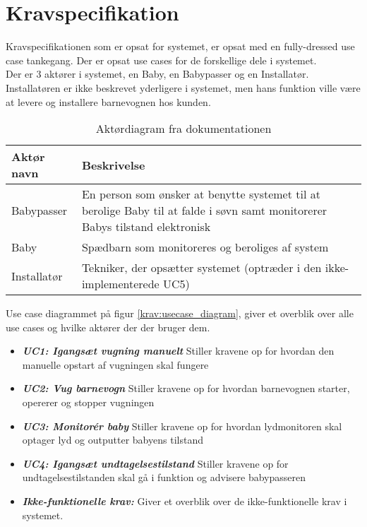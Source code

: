 \chapter{Kravspecifikation}

Kravspecifikationen som er opsat for systemet, er opsat med en fully-dressed use case tankegang. Der er opsat use cases for de forskellige dele i systemet. \\
Der er 3 aktører i systemet, en Baby, en Babypasser og en Installatør. Installatøren er ikke beskrevet yderligere i systemet, men hans funktion ville være at levere og installere barnevognen hos kunden.

\begin{table}[!htbp] \centering
	\caption{Aktørdiagram fra dokumentationen}
	\label{krav:aktoerdiagram}
	\begin{tabular}{|p{2.5cm}|p{11.5cm}|}
	\hline
		\textbf{Aktør navn} & \textbf{Beskrivelse} \\\hline
		Babypasser 
		& En person som ønsker at benytte systemet til at 
		  berolige Baby til at falde i søvn samt monitorerer Babys tilstand elektronisk
		\\\hline
		Baby 
		& Spædbarn som monitoreres og beroliges af system
		\\\hline
		Installatør
		& Tekniker, der opsætter systemet (optræder i den ikke-implementerede UC5)
		\\\hline
	\end{tabular}
\end{table}

Use case diagrammet på figur \ref{krav:usecase_diagram}, giver et overblik over alle use cases og hvilke aktører der der bruger dem.


\begin{itemize}
\item \textbf{\textit{UC1: Igangsæt vugning manuelt}} Stiller kravene op for hvordan den manuelle opstart af vugningen skal fungere
\item \textbf{\textit{UC2: Vug barnevogn}} Stiller kravene op for hvordan barnevognen starter, opererer og stopper vugningen
\item \textbf{\textit{UC3: Monitorér baby}} Stiller kravene op for hvordan lydmonitoren skal optager lyd og outputter babyens tilstand
\item \textbf{\textit{UC4: Igangsæt undtagelsestilstand}} Stiller kravene op for undtagelsestilstanden skal gå i funktion og advisere babypasseren
\item \textbf{\textit{Ikke-funktionelle krav:}} Giver et overblik over de ikke-funktionelle krav i systemet. 
\end{itemize}

